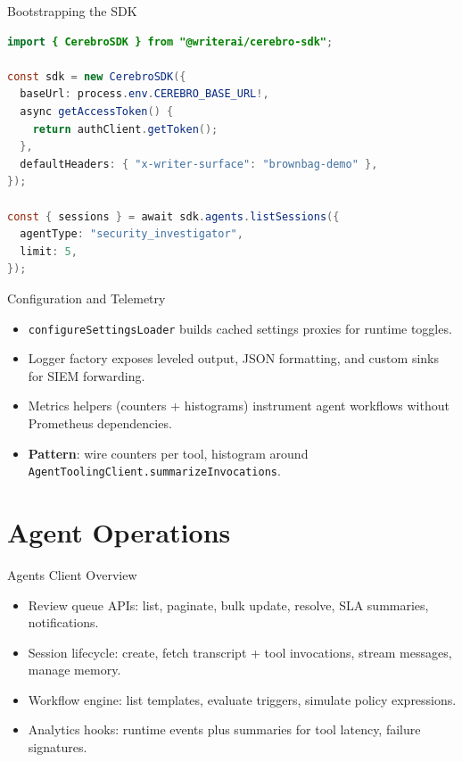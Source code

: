 \documentclass[aspectratio=169]{beamer}
\begin{document}
\begin{frame}[fragile]{Bootstrapping the SDK}
  \begin{lstlisting}[language=Java]
import { CerebroSDK } from "@writerai/cerebro-sdk";

const sdk = new CerebroSDK({
  baseUrl: process.env.CEREBRO_BASE_URL!,
  async getAccessToken() {
    return authClient.getToken();
  },
  defaultHeaders: { "x-writer-surface": "brownbag-demo" },
});

const { sessions } = await sdk.agents.listSessions({
  agentType: "security_investigator",
  limit: 5,
});
\end{lstlisting}
\end{frame}

\begin{frame}{Configuration and Telemetry}
  \begin{itemize}
    \item \texttt{configureSettingsLoader} builds cached settings proxies for runtime toggles.
    \item Logger factory exposes leveled output, JSON formatting, and custom sinks for SIEM forwarding.
    \item Metrics helpers (counters + histograms) instrument agent workflows without Prometheus dependencies.
    \item \textbf{Pattern}: wire counters per tool, histogram around \texttt{AgentToolingClient.summarizeInvocations}.
  \end{itemize}
\end{frame}

\section{Agent Operations}

\begin{frame}{Agents Client Overview}
  \begin{itemize}
    \item Review queue APIs: list, paginate, bulk update, resolve, SLA summaries, notifications.
    \item Session lifecycle: create, fetch transcript + tool invocations, stream messages, manage memory.
    \item Workflow engine: list templates, evaluate triggers, simulate policy expressions.
    \item Analytics hooks: runtime events plus summaries for tool latency, failure signatures.
  \end{itemize}
\end{frame}
\end{document}
